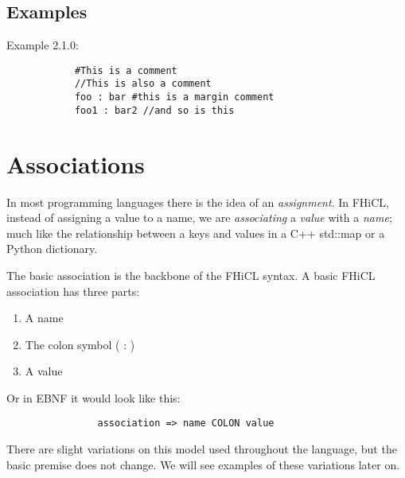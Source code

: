 \documentclass{memarticle}
\begin{document}
	\section{Examples}
		\par
		Example 2.1.0:
		\begin{verbatim}
			#This is a comment
			//This is also a comment
			foo : bar #this is a margin comment
			foo1 : bar2 //and so is this
		\end{verbatim}
\chapter{Associations}
        In most programming languages there is the idea of an \emph{assignment}.
        In FHiCL,  instead of assigning a value to a name,
        we are \emph{associating} a \emph{value} with a \emph{name};
        much like the relationship between a keys and values in a C++ std::map or a Python dictionary.
        \par
        The basic association is the backbone of the FHiCL syntax.
        A basic FHiCL association has three parts:
        \begin{enumerate}
                \item A name
                \item The colon symbol ( : )
                \item A value
        \end{enumerate}
        \par
        Or in EBNF it would look like this:
        \begin{verbatim}
                association => name COLON value
        \end{verbatim}
        \par
        There are slight variations on this model used throughout the language,
        but the basic premise does not change.
        We will see examples of these variations later on.
\end{document}
